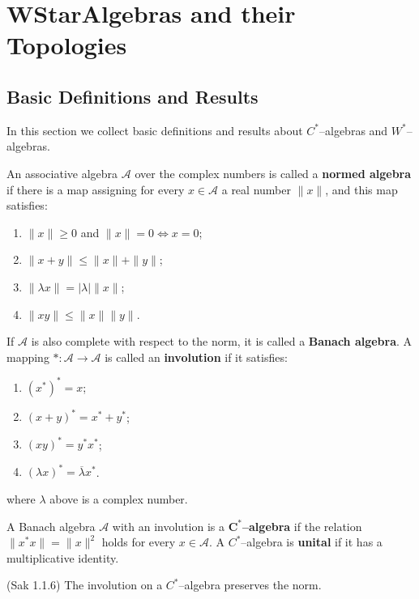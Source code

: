 \chapter{WStarAlgebras and their Topologies}

\section{Basic Definitions and Results}

In this section we collect basic definitions and results about $C^{*}$--algebras and $W^{*}$--algebras.

An associative algebra $\mathcal{A}$ over the complex numbers is called a \textbf{normed algebra}
  if there is a map assigning for every $x\in \mathcal{A}$ a real number $\|x\|$, and this map satisfies:
  \begin{enumerate}
  \item $\|x\|\ge 0$ and $\|x\|=0 \iff x=0$;
  \item $\|x+y\|\le \|x\|+\|y\|$;
  \item $\|\lambda x\|= |\lambda|\|x\|$;
  \item $\|xy\|\le \|x\|\|y\|$.
  \end{enumerate}
  If $\mathcal{A}$ is also complete with respect to the norm, it is called a \textbf{Banach algebra}.
  A mapping $*: \mathcal{A}\to \mathcal{A}$ is called an \textbf{involution} if it satisfies:
  \begin{enumerate}
  \item $(x^{*})^{*}=x$;
  \item $(x+y)^{*}=x^{*}+y^{*}$;
  \item $(xy)^{*}=y^{*}x^{*}$;
  \item $(\lambda x)^{*}=\overline{\lambda}x^{*}$.
  \end{enumerate}
  where $\lambda$ above is a complex number.

\begin{definition}
  \label{def:cstar_def}
  \mathlibok
  A Banach algebra $\mathcal{A}$ with an involution is a $\mathbf{C^{*}}$\textbf{--algebra} if the relation
  $\|x^{*}x\|=\|x\|^{2}$ holds for every $x\in \mathcal{A}$. A $C^{*}$--algebra is \textbf{unital} if it has a multiplicative
  identity.
\end{definition}

\begin{lemma}
  \label{lem:star_pres_norm_Sak_1_1_6} (Sak 1.1.6)
  \mathlibok
  The involution on a $C^{*}$--algebra preserves the norm.
\end{lemma}

